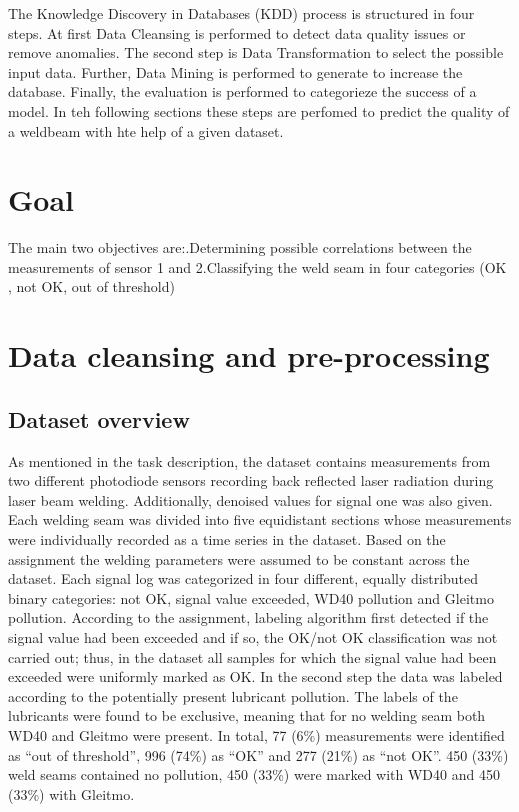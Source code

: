 \documentclass[12pt]{report}
\begin{document}
The Knowledge Discovery in Databases (KDD) process is structured in four steps. At first Data Cleansing is performed to detect data quality issues or remove anomalies. The second step is Data Transformation to select the possible input data. Further, Data Mining is performed to generate to increase the database. Finally, the evaluation is performed to categorieze the success of a model. In teh following sections these steps are perfomed to predict the quality of a weldbeam with hte help of a given dataset.


\section{Goal}
The main two objectives are:\newline{}.\newline Determining possible correlations between the measurements of
sensor 1 and 2\newline{}.\newline Classifying the weld seam in four categories (OK , not OK, out of threshold)



\section{Data cleansing and pre-processing}
\subsection{Dataset overview}
As mentioned in the task description, the dataset contains measurements from two different photodiode sensors recording back reflected laser radiation during laser beam welding. Additionally, denoised values for signal one was also given. Each welding seam was divided into five equidistant sections whose measurements were individually recorded as a time series in the dataset. Based on the assignment the welding parameters were assumed to be constant across the dataset.\newline\newline
Each signal log was categorized in four different, equally distributed binary categories: not OK, signal value exceeded, WD40 pollution and Gleitmo pollution. According to the assignment, labeling algorithm first detected if the signal value had been exceeded and if so, the OK/not OK classification was not carried out; thus, in the dataset all samples for which the signal value had been exceeded were uniformly marked as OK. In the second step the data was labeled according to the potentially present lubricant pollution. The labels of the lubricants were found to be exclusive, meaning that for no welding seam both WD40 and Gleitmo were present. In total, 77 (6\%) measurements were identified as “out of threshold”, 996 (74\%) as “OK” and 277 (21\%) as “not OK”. 450 (33\%) weld seams contained no pollution, 450 (33\%) were marked with WD40 and 450 (33\%) with Gleitmo.
\end{document}
